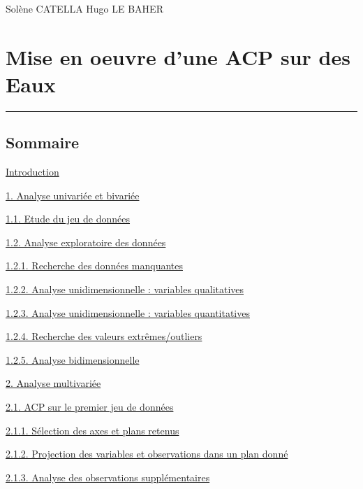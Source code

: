 \documentclass[]{article}
\title{}
\author{}
\date{}
\begin{document}
Solène CATELLA Hugo LE BAHER

\section{Mise en oeuvre d'une ACP sur des
Eaux}\label{mise-en-oeuvre-dune-acp-sur-des-eaux}

\begin{center}\rule{0.5\linewidth}{\linethickness}\end{center}

\subsection{Sommaire}\label{sommaire}

\protect\hyperlink{introduction}{Introduction}

\protect\hyperlink{analyse-univariee-et-bivariee}{1. Analyse univariée
et bivariée}

\protect\hyperlink{etude-du-jeu-de-donnees}{1.1. Etude du jeu de
données}

\protect\hyperlink{analyse-exploratoire-des-donnees}{1.2. Analyse
exploratoire des données}

\protect\hyperlink{recherche-des-donnees-manquantes}{1.2.1. Recherche
des données manquantes}

\protect\hyperlink{analyse-unidimensionnelle-variables-qualitatives}{1.2.2.
Analyse unidimensionnelle : variables qualitatives}

\protect\hyperlink{analyse-unidimensionnelle-variables-quantitatives}{1.2.3.
Analyse unidimensionnelle : variables quantitatives}

\protect\hyperlink{recherche-des-valeurs-extremesoutliers}{1.2.4.
Recherche des valeurs extrêmes/outliers}

\protect\hyperlink{analyse-bidimensionnelle}{1.2.5. Analyse
bidimensionnelle}

\protect\hyperlink{analyse-multivariee}{2. Analyse multivariée}

\protect\hyperlink{acp-sur-le-premier-jeu-de-donnees}{2.1. ACP sur le
premier jeu de données}

\protect\hyperlink{selection-des-axes-et-plans-retenus}{2.1.1. Sélection
des axes et plans retenus}

\protect\hyperlink{projection-des-variables-et-observations-dans-un-plan-donne}{2.1.2.
Projection des variables et observations dans un plan donné}

\protect\hyperlink{analyse-des-observations-supplementaires}{2.1.3.
Analyse des observations supplémentaires}
\end{document}
